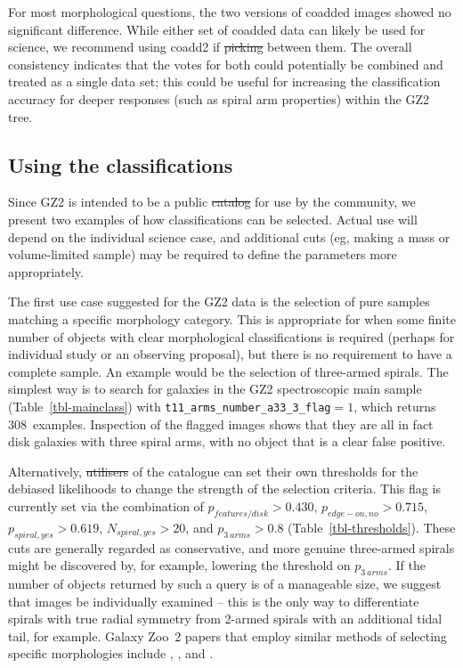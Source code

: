\documentclass[useAMS,usenatbib]{mn2e}
\providecommand{\DIFaddtex}[1]{{\protect\color{blue}\uwave{#1}}} %
\providecommand{\DIFdeltex}[1]{{\protect\color{red}\sout{#1}}}                      %
\providecommand{\DIFaddbegin}{} %
\providecommand{\DIFaddend}{} %
\providecommand{\DIFdelbegin}{} %
\providecommand{\DIFdelend}{} %
\providecommand{\DIFadd}[1]{\texorpdfstring{\DIFaddtex{#1}}{#1}} %
\providecommand{\DIFdel}[1]{\texorpdfstring{\DIFdeltex{#1}}{}} %
\begin{document}
For most morphological questions, the two versions of coadded images showed no significant difference. While either set of coadded data can likely be used for science, we recommend using coadd2 if \DIFdelbegin \DIFdel{picking }\DIFdelend \DIFaddbegin \DIFadd{choosing }\DIFaddend between them. The overall consistency indicates that the votes for both could potentially be combined and treated as a single data set; this could be useful for increasing the classification accuracy for deeper responses (such as spiral arm properties) within the GZ2 tree.

\subsection{Using the classifications}\label{ssec-usingdata}

Since GZ2 is intended to be a public \DIFdelbegin \DIFdel{catalog }\DIFdelend \DIFaddbegin \DIFadd{catalogue }\DIFaddend for use by the community, we present two examples of how classifications can be selected. Actual use will depend on the individual science case, and additional cuts (eg, making a mass or volume-limited sample) may be required to define the parameters more appropriately.

The first use case suggested for the GZ2 data is the selection of pure samples matching a specific morphology category. This is appropriate for when some finite number of objects with clear morphological classifications is required (perhaps for individual study or an observing proposal), but there is no requirement to have a complete sample. An example would be the selection of three-armed spirals. The simplest way is to search for galaxies in the GZ2 spectroscopic main sample (Table~\ref{tbl-mainclass}) with {\tt t11\_arms\_number\_a33\_3\_flag}$ = 1$, which returns 308~examples. Inspection of the flagged images shows that they are all in fact disk galaxies with three spiral arms, with no object that is a clear false positive. 

Alternatively, \DIFdelbegin \DIFdel{utilisers }\DIFdelend \DIFaddbegin \DIFadd{those making use }\DIFaddend of the catalogue can set their own thresholds for the debiased likelihoods to change the strength of the selection criteria. This flag is currently set via the combination of $p_{features/disk}>0.430$, $p_{edge-on,no}>0.715$, $p_{spiral,yes}>0.619$, $N_{spiral,yes}>20$, and $p_{3~arms}>0.8$ (Table~\ref{tbl-thresholds}). These cuts are generally regarded as conservative, and more genuine three-armed spirals might be discovered by, for example, lowering the threshold on $p_{3~arms}$. If the number of objects returned by such a query is of a manageable size, we suggest that images be individually examined -- this is the only way to differentiate spirals with true radial symmetry from 2-armed spirals with an additional tidal tail, for example. Galaxy Zoo~2 papers that employ similar methods of selecting specific morphologies include \citet{mas11c}, \citet{kav12a}, and \citet{sim13}. 
\end{document}
